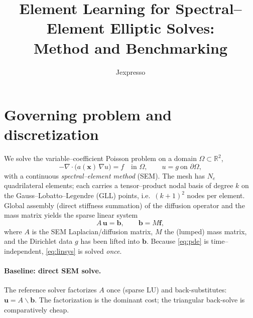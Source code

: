 \documentclass[11pt]{article}
\title{\vspace{-2.5em}Element Learning for Spectral--Element Elliptic Solves:\\
       Method and Benchmarking}
\author{Jexpresso}
\date{}
\newcommand{\uu}{\mathbf{u}}
\newcommand{\ff}{\mathbf{f}}
\begin{document}
\maketitle
\vspace{-2.5em}

\section{Governing problem and discretization}
We solve the variable--coefficient Poisson problem on a domain $\Omega\subset\mathbb{R}^2$,
\begin{equation}
  -\nabla\!\cdot\!\big(a(\mathbf{x})\,\nabla u\big) = f \quad\text{in }\Omega,
  \qquad u = g \ \text{on }\partial\Omega ,
  \label{eq:pde}
\end{equation}
with a continuous \emph{spectral--element method} (SEM). The mesh has $N_e$ quadrilateral
elements; each carries a tensor--product nodal basis of degree $k$ on the
Gauss--Lobatto--Legendre (GLL) points, i.e.\ $(k{+}1)^2$ nodes per element. Global
assembly (direct stiffness summation) of the diffusion operator and the mass matrix
yields the sparse linear system
\begin{equation}
  A\,\uu = \mathbf{b}, \qquad \mathbf{b} = M\ff ,
  \label{eq:linsys}
\end{equation}
where $A$ is the SEM Laplacian/diffusion matrix, $M$ the (lumped) mass matrix, and the
Dirichlet data $g$ has been lifted into $\mathbf{b}$. Because \eqref{eq:pde} is
time--independent, \eqref{eq:linsys} is solved \emph{once}.

\paragraph{Baseline: direct SEM solve.} The reference solver factorizes $A$ once
(sparse LU) and back-substitutes: $\uu = A\backslash\mathbf{b}$. The factorization is the
dominant cost; the triangular back-solve is comparatively cheap.
\end{document}
